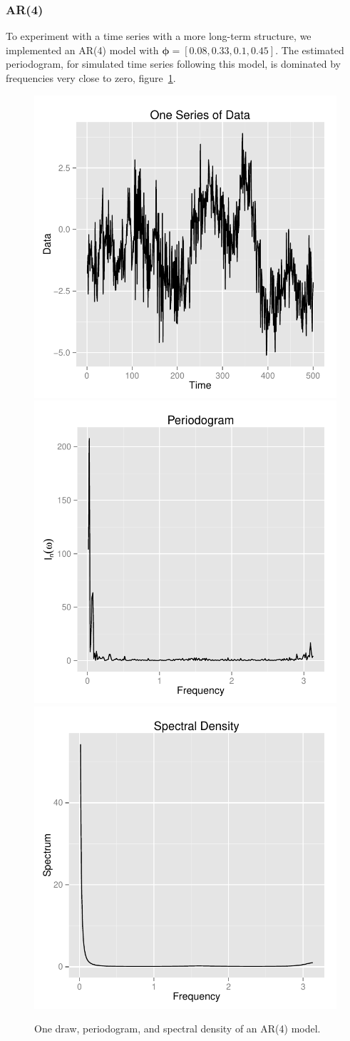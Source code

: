 \documentclass{article}\usepackage[]{graphicx}\usepackage[]{color}
\newenvironment{knitrout}{}{} %
\theoremstyle{plain}
\begin{document}
\subsubsection{AR(4)}
To experiment with a time series with a more long-term structure, we implemented an AR(4) model with $\boldsymbol{\phi} = [0.08, 0.33, 0.1, 0.45]$. The estimated periodogram, for simulated time series following this model, is dominated by frequencies very close to zero, figure~\ref{fig:inital-ar4}. 
\begin{knitrout}
\color{fgcolor}\begin{figure}[h]

\includegraphics[width=.33\textwidth]{figure/inital-ar41} 
\includegraphics[width=.33\textwidth]{figure/inital-ar42} 
\includegraphics[width=.33\textwidth]{figure/inital-ar43} \caption[One draw, periodogram, and spectral density of an AR(4) model]{One draw, periodogram, and spectral density of an AR(4) model.\label{fig:inital-ar4}}
\end{figure}


\end{knitrout}
\end{document}
